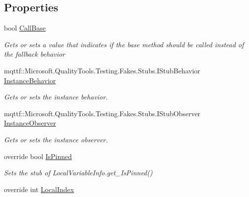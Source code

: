 \subsection*{Properties}
\begin{DoxyCompactItemize}
\item 
bool \hyperlink{class_system_1_1_reflection_1_1_fakes_1_1_stub_local_variable_info_ae62478949c7519a169b51d8c6cd4f92c}{Call\-Base}
\begin{DoxyCompactList}\small\item\em Gets or sets a value that indicates if the base method should be called instead of the fallback behavior\end{DoxyCompactList}\item 
mqttf\-::\-Microsoft.\-Quality\-Tools.\-Testing.\-Fakes.\-Stubs.\-I\-Stub\-Behavior \hyperlink{class_system_1_1_reflection_1_1_fakes_1_1_stub_local_variable_info_a5fc9180623a5b34e2becd436aea4bd1b}{Instance\-Behavior}
\begin{DoxyCompactList}\small\item\em Gets or sets the instance behavior.\end{DoxyCompactList}\item 
mqttf\-::\-Microsoft.\-Quality\-Tools.\-Testing.\-Fakes.\-Stubs.\-I\-Stub\-Observer \hyperlink{class_system_1_1_reflection_1_1_fakes_1_1_stub_local_variable_info_aec34d143b65bfdba0ed961ac6b24d243}{Instance\-Observer}
\begin{DoxyCompactList}\small\item\em Gets or sets the instance observer.\end{DoxyCompactList}\item 
override bool \hyperlink{class_system_1_1_reflection_1_1_fakes_1_1_stub_local_variable_info_a9fe37c98525c334cb167f58ae0bf8cc8}{Is\-Pinned}
\begin{DoxyCompactList}\small\item\em Sets the stub of Local\-Variable\-Info.\-get\-\_\-\-Is\-Pinned()\end{DoxyCompactList}\item 
override int \hyperlink{class_system_1_1_reflection_1_1_fakes_1_1_stub_local_variable_info_a07deb7f1dbaa01e9c12a6bf64c9bf2f9}{Local\-Index}

\end{DoxyCompactItemize}
